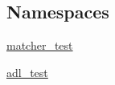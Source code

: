 \subsection*{Namespaces}
\begin{DoxyCompactItemize}
\item 
 \hyperlink{namespacematcher__test}{matcher\+\_\+test}
\item 
 \hyperlink{namespaceadl__test}{adl\+\_\+test}
\end{DoxyCompactItemize}
